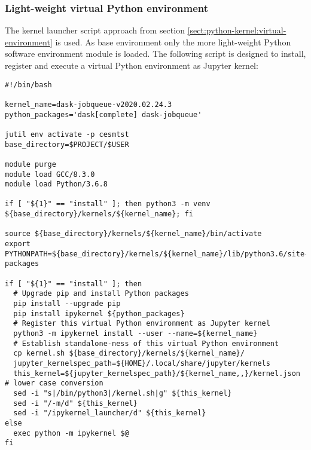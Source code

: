 \subsubsection{Light-weight virtual Python environment}
\label{sect:suggested-python-virtual-environment}

The kernel launcher script approach from section \ref{sect:python-kernel:virtual-environment} is used.
As base environment only the more light-weight Python software environment module is loaded.
The following script is designed to install, register and execute a virtual Python environment as Jupyter kernel:
%
\begin{verbatim}
#!/bin/bash

kernel_name=dask-jobqueue-v2020.02.24.3
python_packages='dask[complete] dask-jobqueue'

jutil env activate -p cesmtst
base_directory=$PROJECT/$USER

module purge
module load GCC/8.3.0
module load Python/3.6.8

if [ "${1}" == "install" ]; then python3 -m venv ${base_directory}/kernels/${kernel_name}; fi

source ${base_directory}/kernels/${kernel_name}/bin/activate
export PYTHONPATH=${base_directory}/kernels/${kernel_name}/lib/python3.6/site-packages

if [ "${1}" == "install" ]; then
  # Upgrade pip and install Python packages
  pip install --upgrade pip
  pip install ipykernel ${python_packages}
  # Register this virtual Python environment as Jupyter kernel
  python3 -m ipykernel install --user --name=${kernel_name}
  # Establish standalone-ness of this virtual Python environment
  cp kernel.sh ${base_directory}/kernels/${kernel_name}/
  jupyter_kernelspec_path=${HOME}/.local/share/jupyter/kernels
  this_kernel=${jupyter_kernelspec_path}/${kernel_name,,}/kernel.json # lower case conversion
  sed -i "s|/bin/python3|/kernel.sh|g" ${this_kernel}
  sed -i "/-m/d" ${this_kernel}
  sed -i "/ipykernel_launcher/d" ${this_kernel}
else
  exec python -m ipykernel $@
fi

\end{verbatim}



